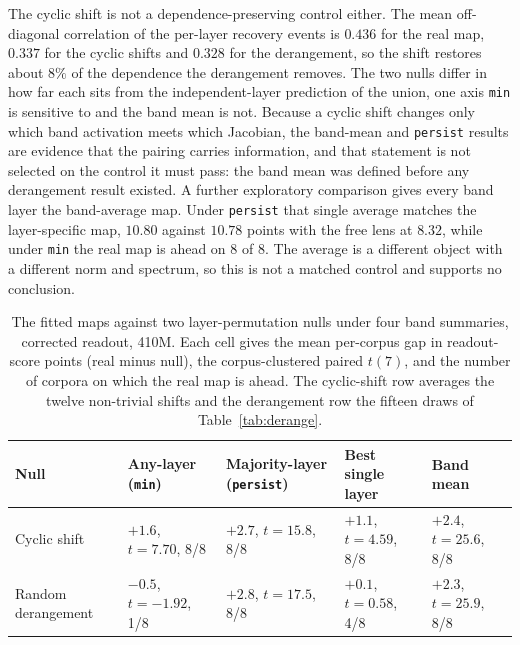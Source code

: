 \documentclass{article}
\newcommand{\mn}{\texttt{min}}
\newcommand{\pe}{\texttt{persist}}
\begin{document}
The cyclic shift is not a dependence-preserving control either. The mean off-diagonal correlation
of the per-layer recovery events is $0.436$ for the real map, $0.337$ for the cyclic shifts
and $0.328$ for the derangement, so the shift restores about $8\%$ of the dependence the
derangement removes. The two nulls differ in how far each sits from the independent-layer prediction of the union, one
axis \mn{} is sensitive to and the band mean is not. Because a cyclic
shift changes only which band activation meets which Jacobian, the band-mean and \pe{} results are
evidence that the pairing carries information, and that statement is not selected on the control
it must pass: the band mean was defined before any derangement result existed. A further
exploratory comparison gives every band layer the band-average map. Under \pe{} that single average matches the layer-specific map, $10.80$ against $10.78$ points
with the free lens at $8.32$, while under \mn{} the real map is ahead on 8 of 8. The average is a different object
with a different norm and spectrum, so this is not a matched control and supports no conclusion.

\begin{table}[H]
\centering\scriptsize\setlength{\abovecaptionskip}{2pt}\setlength{\belowcaptionskip}{4pt}\setlength{\tabcolsep}{4pt}
\caption{The fitted maps against two layer-permutation nulls under four band summaries, corrected
readout, 410M. Each cell gives the mean per-corpus gap in readout-score points (real minus null), the
corpus-clustered paired $t(7)$, and the number of corpora on which the real map is ahead. The
cyclic-shift row averages the twelve non-trivial shifts and the derangement row the fifteen draws
of Table~\ref{tab:derange}.}
\label{tab:da1}
\begin{tabular}{@{}lllll@{}}
\toprule
Null & Any-layer (\mn) & Majority-layer (\pe) & Best single layer & Band mean \\
\midrule
Cyclic shift & $+1.6$, $t{=}7.70$, 8/8 & $+2.7$, $t{=}15.8$, 8/8 & $+1.1$, $t{=}4.59$, 8/8 & $+2.4$, $t{=}25.6$, 8/8 \\
Random derangement & $-0.5$, $t{=}-1.92$, 1/8 & $+2.8$, $t{=}17.5$, 8/8 & $+0.1$, $t{=}0.58$, 4/8 & $+2.3$, $t{=}25.9$, 8/8 \\
\bottomrule
\end{tabular}
\end{table}

\tblderange
\tblclustered
\end{document}
